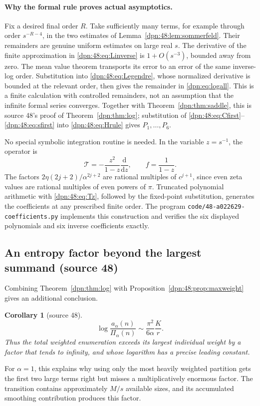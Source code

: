 \documentclass[11pt]{article}
\numberwithin{equation}{section}
\newtheorem{corollary}[theorem]{Corollary}
\theoremstyle{definition}\newtheorem{definition}[theorem]{Definition}
\theoremstyle{remark}\newtheorem{remark}[theorem]{Remark}
\newcommand{\src}[1]{\textup{(source #1)}}
\newcommand{\file}[1]{\nolinkurl{#1}}
\newcommand{\Top}{\mathcal T}
\begin{document}
\paragraph{Why the formal rule proves actual asymptotics.}
Fix a desired final order $R$.  Take sufficiently many terms, for example
through order $s^{-R-4}$, in the two estimates of
Lemma~\ref{dpn:48:lem:sommerfeld}.  Their remainders are genuine uniform
estimates on large real $s$.  The derivative of the finite approximation in
\eqref{dpn:48:eq:Linverse} is $1+O(s^{-3})$, bounded away from zero.  The mean
value theorem transports its error to an error of the same inverse-log order.
Substitution into \eqref{dpn:48:eq:Legendre}, whose normalized derivative is
bounded at the relevant order, then gives the remainder in
\eqref{dpn:eq:logall}.  This is a finite calculation with controlled
remainders, not an assumption that the infinite formal series converges.
Together with Theorem~\ref{dpn:thm:saddle}, this is source 48's proof of
Theorem~\ref{dpn:thm:log}; substitution of
\eqref{dpn:48:eq:Cfirst}--\eqref{dpn:48:eq:sfirst} into
\eqref{dpn:48:eq:Hrule} gives $P_1,\dots,P_6$.

No special symbolic integration routine is needed.  In the variable
$z=s^{-1}$, the operator is
\begin{equation}\label{dpn:48:eq:Tz}
 \Top=-\frac{z^2}{1-z}\frac{\mathrm d}{\mathrm dz},\qquad f=\frac1{1-z}.
\end{equation}
The factors $2\eta(2j+2)/\alpha^{2j+2}$ are rational multiples of $c^{j+1}$,
since even zeta values are rational multiples of even powers of $\pi$.
Truncated polynomial arithmetic with \eqref{dpn:48:eq:Tz}, followed by the
fixed-point substitution, generates the coefficients at any prescribed finite
order.  The program \file{code/48-a022629-coefficients.py} implements this
construction and verifies the six displayed polynomials and six inverse
coefficients exactly.

\subsection{An entropy factor beyond the largest summand \src{48}}
Combining Theorem~\ref{dpn:thm:log} with
Proposition~\ref{dpn:48:prop:maxweight} gives an additional conclusion.
\begin{corollary}[source 48]\label{dpn:48:cor:entropy}
\begin{equation}\label{dpn:48:eq:entropy}
 \log\frac{a_\alpha(n)}{\Pi_\alpha(n)}\sim\frac{\pi^2}{6\alpha}\frac{K}{r}.
\end{equation}
Thus the total weighted enumeration exceeds its largest individual weight by a
factor that tends to infinity, and whose logarithm has a precise leading
constant.
\end{corollary}
For $\alpha=1$, this explains why using only the most heavily weighted
partition gets the first two large terms right but misses a multiplicatively
enormous factor.  The transition contains approximately $M/s$ available sizes,
and its accumulated smoothing contribution produces this factor.
\end{document}
